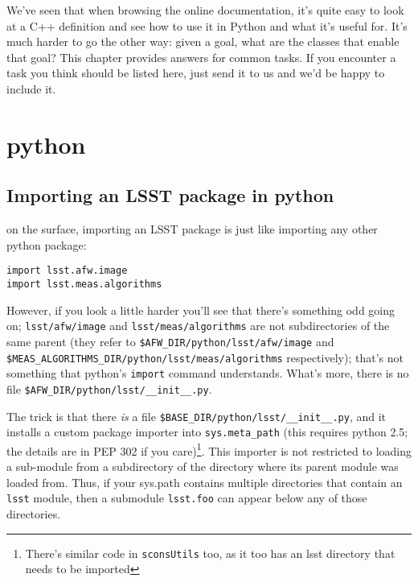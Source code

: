 
We've seen that when browsing the online documentation, it's quite
easy to look at a C++ definition and see how to use it in Python and
what it's useful for.  It's much harder to go the other way: given a
goal, what are the classes that enable that goal?  This chapter
provides answers for common tasks. If you encounter a task you think
should be listed here, just send it to us and we'd be happy to include
it.

\section{python}

\subsection{Importing an LSST package in python}

on the surface, importing an LSST package is just like importing any other python package:
\begin{verbatim}
import lsst.afw.image
import lsst.meas.algorithms
\end{verbatim}

However, if you look a little harder you'll see that there's something odd going on; \verb|lsst/afw/image| and
\verb|lsst/meas/algorithms| are not subdirectories of the same parent (they refer to
\verb|$AFW_DIR/python/lsst/afw/image| and \hfil\break\verb|$MEAS_ALGORITHMS_DIR/python/lsst/meas/algorithms| respectively);
that's not something that python's \verb|import| command understands.  What's more, there is no file
\verb|$AFW_DIR/python/lsst/__init__.py|.

The trick is that there \textit{is} a file \verb|$BASE_DIR/python/lsst/__init__.py|, and it installs a custom
package importer into \verb|sys.meta_path| (this requires python 2.5; the details are in PEP 302 if you care)\footnote{There's similar code in \texttt{sconsUtils} too, as it too has an lsst directory that needs to be imported}.
This importer is not restricted to loading a sub-module from a subdirectory of the directory where its parent
module was loaded from.  Thus, if your sys.path contains multiple directories that contain an \verb|lsst|
module, then a submodule \verb|lsst.foo| can appear below any of those directories.

